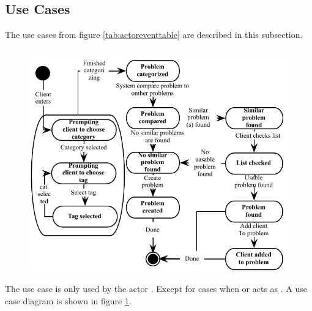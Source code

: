 \subsection{Use Cases}
\label{sec:usecase}

The use cases from figure \ref{tab:actoreventtable} are described in this subsection.  

\subsubsection{\ucsproblem[c]} 
\begin{figure}[htbp]
\begin{center}
 \includegraphics[scale=0.8]{input/application_domain_analysis/submit_problem_use_case}
\label{fig:submit_problem_use_case}
\end{center}
\end{figure}
The use case \ucsproblem[] is only used by the actor \aclient. Except for cases when \astaff{} or \sadmin{}  acts as \aclient{}. A use case diagram is shown in figure \ref{fig:submit_problem_use_case}. 
